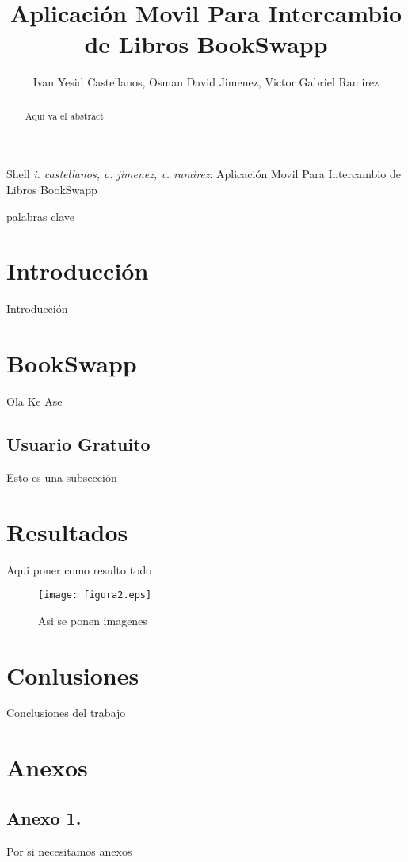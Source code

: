 \documentclass[]{IEEEtran}
\begin{document}
\title{Aplicación Movil Para Intercambio de Libros BookSwapp}
\author{Ivan Yesid Castellanos, Osman David Jimenez, Victor Gabriel Ramirez}

{Shell \MakeLowercase{\textit{I. Castellanos, O. Jimenez, V. Ramirez}}: Aplicación Movil Para Intercambio de Libros BookSwapp}

\maketitle

\begin{abstract}
Aqui va el abstract
\end{abstract}

\begin{IEEEkeywords}
	palabras clave
\end{IEEEkeywords}

\IEEEpeerreviewmaketitle

\section{Introducción}

Introducción

\section{BookSwapp}

Ola Ke Ase 

\subsection{Usuario Gratuito}

Esto es una subsección

\section{Resultados}

Aqui poner como resulto todo

\begin{figure}
	\centering
	\captionsetup{justification=centering}
	\texttt{[image: figura2.eps]}
	\caption{Asi se ponen imagenes}
	\label{FIG2}
\end{figure}

\section{Conlusiones}

Conclusiones del trabajo





\newpage

\section*{Anexos}

\subsection{Anexo 1. }\label{sec:Anexo1}

Por si necesitamos anexos
\end{document}
